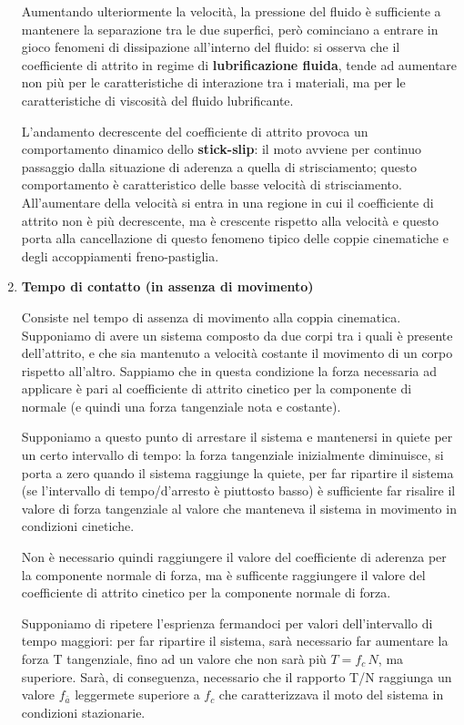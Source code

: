 \begin{enumerate}
Aumentando ulteriormente la velocità, la pressione del fluido è sufficiente a mantenere la separazione tra le due superfici, però cominciano a entrare in gioco fenomeni di dissipazione all'interno del fluido: si osserva che il coefficiente di attrito in regime di \textbf{lubrificazione fluida}, tende ad aumentare non più per le caratteristiche di interazione tra i materiali, ma per le caratteristiche di viscosità del fluido lubrificante.

L'andamento decrescente del coefficiente di attrito provoca un comportamento dinamico dello \textbf{stick-slip}: il moto avviene per continuo passaggio dalla situazione di aderenza a quella di strisciamento; questo comportamento è caratteristico delle basse velocità di strisciamento. All'aumentare della velocità si entra in una regione in cui il coefficiente di attrito non è più decrescente, ma è crescente rispetto alla velocità e questo porta alla cancellazione di questo fenomeno tipico delle coppie cinematiche e degli accoppiamenti freno-pastiglia.

\item \textbf{Tempo di contatto (in assenza di movimento)}

Consiste nel tempo di assenza di movimento alla coppia cinematica. Supponiamo di avere un sistema composto da due corpi tra i quali è presente dell'attrito, e che sia mantenuto a velocità costante il movimento di un corpo rispetto all'altro. Sappiamo che in questa condizione la forza necessaria ad applicare è pari al coefficiente di attrito cinetico per la componente di normale (e quindi una forza tangenziale nota e costante).

Supponiamo a questo punto di arrestare il sistema e mantenersi in quiete per un certo intervallo di tempo: la forza tangenziale inizialmente diminuisce, si porta a zero quando il sistema raggiunge la quiete, per far ripartire il sistema (se l'intervallo di tempo/d'arresto è piuttosto basso) è sufficiente far risalire il valore di forza tangenziale al valore che manteneva il sistema in movimento in condizioni cinetiche.

Non è necessario quindi raggiungere il valore del coefficiente di aderenza per la componente normale di forza, ma è sufficente raggiungere il valore del coefficiente di attrito cinetico per la componente normale di forza.

Supponiamo di ripetere l'esprienza fermandoci per valori dell'intervallo di tempo maggiori: per far ripartire il sistema, sarà necessario far aumentare la forza T tangenziale, fino ad un valore che non sarà più $T = f_c\,N$, ma superiore. Sarà, di conseguenza, necessario che il rapporto T/N raggiunga un valore $f_{\overset{\_}{a}}$ leggermete superiore a $f_c$ che caratterizzava il moto del sistema in condizioni stazionarie.


\end{enumerate}
